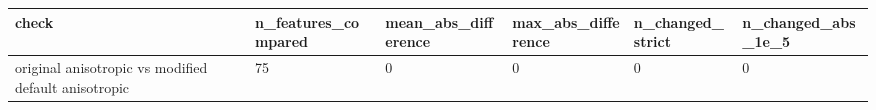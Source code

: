 \begin{tabular}{llllll}
\toprule
check & n\_features\_compared & mean\_abs\_difference & max\_abs\_difference & n\_changed\_strict & n\_changed\_abs\_1e\_5 \\
\midrule
original anisotropic vs modified default anisotropic & 75 & 0 & 0 & 0 & 0 \\
\bottomrule
\end{tabular}
